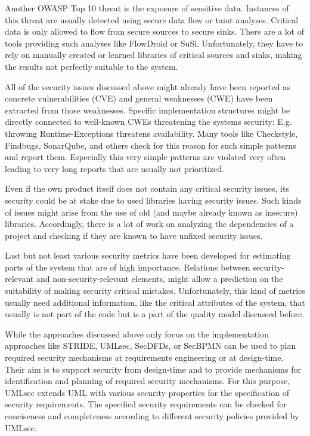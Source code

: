 Another OWASP Top 10 threat is the exposure of sensitive data. Instances of this threat are usually detected using secure data flow or taint analyses. Critical data is only allowed to flow from secure sources to secure sinks. There are a lot of tools providing such analyses like FlowDroid or SuSi. Unfortunately, they have to rely on manually created or learned libraries of critical sources and sinks, making the results not perfectly suitable to the system.

All of the security issues discussed above might already have been reported as concrete vulnerabilities (CVE) and general weaknesses (CWE) have been extracted from those weaknesses. Specific implementation structures might be directly connected to well-known CWEs threatening the systems security: E.g. throwing Runtime-Exceptions threatens availability. Many tools like Checkstyle, Findbugs, SonarQube, and others check for this reason for such simple patterns and report them. Especially this very simple patterns are violated very often leading to very long reports that are usually not prioritized.

Even if the own product itself does not contain any critical security issues, its security could be at stake due to used libraries having security issues. Such kinds of issues might arise from the use of old (and maybe already known as insecure) libraries. Accordingly, there is a lot of work on analyzing the dependencies of a project and checking if they are known to have unfixed security issues.

Last but not least various security metrics have been developed for estimating parts of the system that are of high importance. Relations between security-relevant and non-security-relevant elements, might allow a prediction on the suitability of making security critical mistakes. Unfortunately, this kind of metrics usually need additional information, like the critical attributes of the system, that usually is not part of the code but is a part of the quality model discussed before.

While the approaches discussed above only focus on the implementation approaches like STRIDE, UMLsec, SecDFDs, or SecBPMN can be used to plan required security mechanisms at requirements engineering or at design-time. Their aim is to support security from design-time and to provide mechanisms for identification and planning of required security mechanisms. For this purpose, UMLsec extends UML with various security properties for the specification of security requirements. The specified security requirements can be checked for conciseness and completeness according to different security policies provided by UMLsec.

